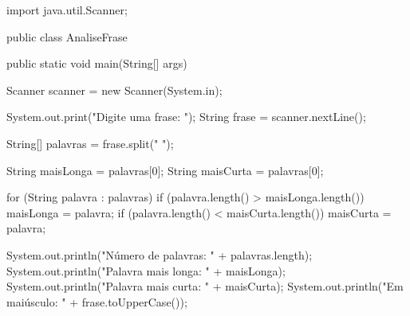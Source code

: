 \documentclass[11pt,a4paper]{article}
\begin{document}
\begin{javacode}
import java.util.Scanner;

public class AnaliseFrase {
    public static void main(String[] args) {
        Scanner scanner = new Scanner(System.in);

        System.out.print("Digite uma frase: ");
        String frase = scanner.nextLine();

        String[] palavras = frase.split(" ");

        String maisLonga = palavras[0];
        String maisCurta = palavras[0];

        for (String palavra : palavras) {
            if (palavra.length() > maisLonga.length()) {
                maisLonga = palavra;
            }
            if (palavra.length() < maisCurta.length()) {
                maisCurta = palavra;
            }
        }

        System.out.println("Número de palavras: " + palavras.length);
        System.out.println("Palavra mais longa: " + maisLonga);
        System.out.println("Palavra mais curta: " + maisCurta);
        System.out.println("Em maiúsculo: " + frase.toUpperCase());
    }
}
\end{javacode}
\end{document}
